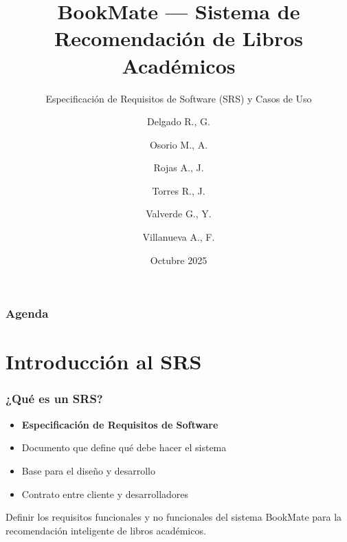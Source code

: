 \documentclass[aspectratio=169]{beamer}
\title[BookMate]{BookMate — Sistema de Recomendación de Libros Académicos}
\subtitle{Especificación de Requisitos de Software (SRS) y Casos de Uso}
\author[GRUPO 6]{Delgado R., G. \and Osorio M., A. \and Rojas A., J. \and Torres R., J. \and Valverde G., Y. \and Villanueva A., F.}
\institute[FC-UNI]{UNIVERSIDAD NACIONAL DE INGENIERÍA}
\date{Octubre 2025}
\begin{document}
\begin{frame}
\titlepage
\end{frame}

\begin{frame}
\frametitle{Agenda}
\tableofcontents
\end{frame}

\section{Introducción al SRS}

\begin{frame}
\frametitle{¿Qué es un SRS?}

\begin{itemize}
\item \textbf{Especificación de Requisitos de Software}
\item Documento que define qué debe hacer el sistema
\item Base para el diseño y desarrollo
\item Contrato entre cliente y desarrolladores
\end{itemize}

\vspace{0.5cm}

\begin{tcolorbox}[title=Objetivo del SRS BookMate]
Definir los requisitos funcionales y no funcionales del sistema BookMate para la recomendación inteligente de libros académicos.
\end{tcolorbox}

\end{frame}
\end{document}
